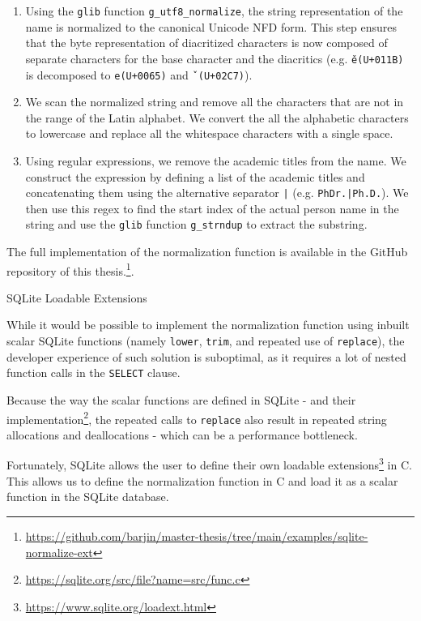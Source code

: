 \begin{enumerate}
    \item Using the \texttt{glib} function \texttt{g\_utf8\_normalize}, the string representation of the name is normalized to the canonical Unicode \ac{NFD} form.
    This step ensures that the byte representation of diacritized characters is now composed of separate characters for the base character and the diacritics (e.g. \texttt{ě}\texttt{(U+011B)} is decomposed to \texttt{e}\texttt{(U+0065)} and \texttt{ˇ}\texttt{(U+02C7)}).
    \item We scan the normalized string and remove all the characters that are not in the range of the Latin alphabet. We convert the all the 
    alphabetic characters to lowercase and replace all the whitespace characters with a single space.
    \item Using regular expressions, we remove the academic titles from the name. 
    We construct the expression by defining a list of the academic titles and concatenating them using the alternative separator \texttt{|} (e.g. \texttt{PhDr.|Ph.D.}).
    We then use this regex to find the start index of the actual person name in the string
    and use the \texttt{glib} function \texttt{g\_strndup} to extract the substring.
\end{enumerate}

The full implementation of the normalization function is available in the GitHub repository of this thesis.\footnote{\url{https://github.com/barjin/master-thesis/tree/main/examples/sqlite-normalize-ext}}.

\begin{mybox}
    {SQLite Loadable Extensions}

    While it would be possible to implement the normalization function using inbuilt scalar SQLite functions (namely \texttt{lower}, \texttt{trim},
    and repeated use of \texttt{replace}), the developer experience of such solution is suboptimal, as it requires a lot of nested function calls
    in the \texttt{SELECT} clause.

    Because the way the scalar functions are defined in SQLite - and their implementation\footnote{\url{https://sqlite.org/src/file?name=src/func.c}}, 
    the repeated calls to \texttt{replace} also result in repeated string allocations and deallocations - which can be a performance bottleneck.

    Fortunately, SQLite allows the user to define their own loadable extensions\footnote{\url{https://www.sqlite.org/loadext.html}} in C.
    This allows us to define the normalization function in C and load it as a scalar function in the SQLite database.
\end{mybox}

